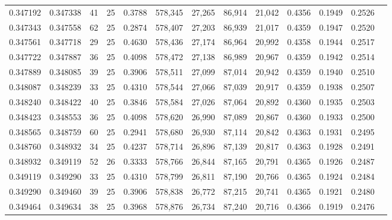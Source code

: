 \begin{tabular}{rrrrrrrrrrrrr}
0.347192 & 0.347338 &    41 &  25 &                                     0.3788 & 578,345 &  27,265 &  86,914 &  21,042 & 0.4356 & 0.1949 & 0.2526 \\
0.347343 & 0.347558 &    62 &  25 &                                     0.2874 & 578,407 &  27,203 &  86,939 &  21,017 & 0.4359 & 0.1947 & 0.2520 \\
0.347561 & 0.347718 &    29 &  25 &                                     0.4630 & 578,436 &  27,174 &  86,964 &  20,992 & 0.4358 & 0.1944 & 0.2517 \\
0.347722 & 0.347887 &    36 &  25 &                                     0.4098 & 578,472 &  27,138 &  86,989 &  20,967 & 0.4359 & 0.1942 & 0.2514 \\
0.347889 & 0.348085 &    39 &  25 &                                     0.3906 & 578,511 &  27,099 &  87,014 &  20,942 & 0.4359 & 0.1940 & 0.2510 \\
0.348087 & 0.348239 &    33 &  25 &                                     0.4310 & 578,544 &  27,066 &  87,039 &  20,917 & 0.4359 & 0.1938 & 0.2507 \\
0.348240 & 0.348422 &    40 &  25 &                                     0.3846 & 578,584 &  27,026 &  87,064 &  20,892 & 0.4360 & 0.1935 & 0.2503 \\
0.348423 & 0.348553 &    36 &  25 &                                     0.4098 & 578,620 &  26,990 &  87,089 &  20,867 & 0.4360 & 0.1933 & 0.2500 \\
0.348565 & 0.348759 &    60 &  25 &                                     0.2941 & 578,680 &  26,930 &  87,114 &  20,842 & 0.4363 & 0.1931 & 0.2495 \\
0.348760 & 0.348932 &    34 &  25 &                                     0.4237 & 578,714 &  26,896 &  87,139 &  20,817 & 0.4363 & 0.1928 & 0.2491 \\
0.348932 & 0.349119 &    52 &  26 &                                     0.3333 & 578,766 &  26,844 &  87,165 &  20,791 & 0.4365 & 0.1926 & 0.2487 \\
0.349119 & 0.349290 &    33 &  25 &                                     0.4310 & 578,799 &  26,811 &  87,190 &  20,766 & 0.4365 & 0.1924 & 0.2484 \\
0.349290 & 0.349460 &    39 &  25 &                                     0.3906 & 578,838 &  26,772 &  87,215 &  20,741 & 0.4365 & 0.1921 & 0.2480 \\
0.349464 & 0.349634 &    38 &  25 &                                     0.3968 & 578,876 &  26,734 &  87,240 &  20,716 & 0.4366 & 0.1919 & 0.2476 \\

\end{tabular}
